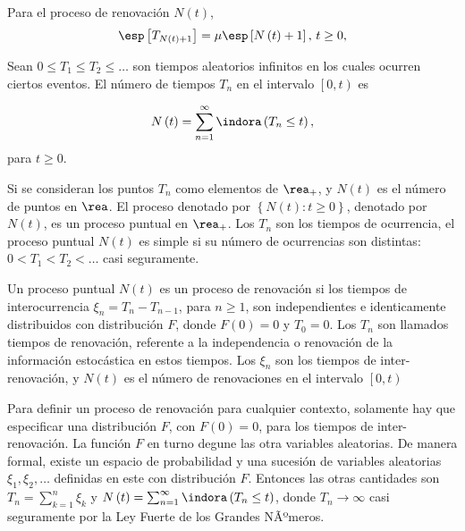 \begin{Coro}
Para el proceso de renovaci\'on $N\left(t\right)$,
\begin{eqnarray*}
\esp\left[T_{N\left(t\right)+1}\right]=\mu\esp\left[N\left(t\right)+1\right]\textrm{,  }t\geq0,
\end{eqnarray*}  
\end{Coro}


\begin{Def}\label{Def.Tn}
Sean $0\leq T_{1}\leq T_{2}\leq \ldots$ son tiempos aleatorios infinitos en los cuales ocurren ciertos eventos. El n\'umero de tiempos $T_{n}$ en el intervalo $\left[0,t\right)$ es

\begin{eqnarray}
N\left(t\right)=\sum_{n=1}^{\infty}\indora\left(T_{n}\leq t\right),
\end{eqnarray}
para $t\geq0$.
\end{Def}

Si se consideran los puntos $T_{n}$ como elementos de $\rea_{+}$, y $N\left(t\right)$ es el n\'umero de puntos en $\rea$. El proceso denotado por $\left\{N\left(t\right):t\geq0\right\}$, denotado por $N\left(t\right)$, es un proceso puntual en $\rea_{+}$. Los $T_{n}$ son los tiempos de ocurrencia, el proceso puntual $N\left(t\right)$ es simple si su n\'umero de ocurrencias son distintas: $0<T_{1}<T_{2}<\ldots$ casi seguramente.

\begin{Def}
Un proceso puntual $N\left(t\right)$ es un proceso de renovaci\'on si los tiempos de interocurrencia $\xi_{n}=T_{n}-T_{n-1}$, para $n\geq1$, son independientes e identicamente distribuidos con distribuci\'on $F$, donde $F\left(0\right)=0$ y $T_{0}=0$. Los $T_{n}$ son llamados tiempos de renovaci\'on, referente a la independencia o renovaci\'on de la informaci\'on estoc\'astica en estos tiempos. Los $\xi_{n}$ son los tiempos de inter-renovaci\'on, y $N\left(t\right)$ es el n\'umero de renovaciones en el intervalo $\left[0,t\right)$
\end{Def}


\begin{Note}
Para definir un proceso de renovaci\'on para cualquier contexto, solamente hay que especificar una distribuci\'on $F$, con $F\left(0\right)=0$, para los tiempos de inter-renovaci\'on. La funci\'on $F$ en turno degune las otra variables aleatorias. De manera formal, existe un espacio de probabilidad y una sucesi\'on de variables aleatorias $\xi_{1},\xi_{2},\ldots$ definidas en este con distribuci\'on $F$. Entonces las otras cantidades son $T_{n}=\sum_{k=1}^{n}\xi_{k}$ y $N\left(t\right)=\sum_{n=1}^{\infty}\indora\left(T_{n}\leq t\right)$, donde $T_{n}\rightarrow\infty$ casi seguramente por la Ley Fuerte de los Grandes NÃºmeros.
\end{Note}

